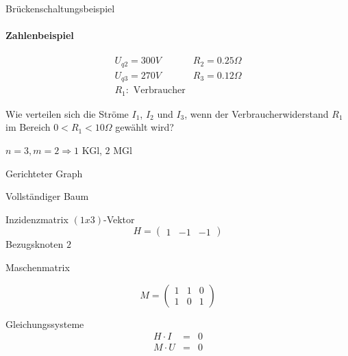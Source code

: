 \documentclass[german]{article}
\newcommand{\ohm}{\Omega}
\begin{document}
	Brückenschaltungsbeispiel
	\[
	\]

	\paragraph{Zahlenbeispiel}
	

	\[
		\begin{array}{cc}
			U_{q2} = 300V & R_2 = 0.25\ohm \\
			U_{q3} = 270V & R_3 = 0.12\ohm \\
			R_1: \text{ Verbraucher}
		\end{array}
	\]

	Wie verteilen sich die Ströme $I_1$, $I_2$ und $I_3$, wenn der Verbraucherwiderstand $R_1$ im Bereich $0 < R_1 < 10\ohm$ gewählt wird?

	$n = 3, m = 2 \Rightarrow 1$ KGl, $2$ MGl

	Gerichteter Graph

	Vollständiger Baum

	Inzidenzmatrix $(1x3)$-Vektor
	\[
		H =
		\begin{pmatrix}
			1 & -1 & -1
		\end{pmatrix}
	\]
	Bezugsknoten $2$

	Maschenmatrix

	\[
		M = 
		\begin{pmatrix}
			1 & 1 & 0 \\
			1 & 0 & 1
		\end{pmatrix}
	\]

	Gleichungssysteme
	\begin{eqnarray*}
		H \cdot I & = & 0 \\
		M \cdot U & = & 0
	\end{eqnarray*}
\end{document}
